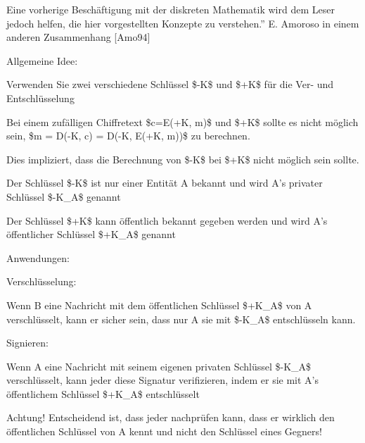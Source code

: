 \documentclass[a4paper]{article}
\begin{document}
\begin{multicols}{3}
      Eine vorherige Beschäftigung mit der diskreten Mathematik wird dem Leser
      jedoch helfen, die hier vorgestellten Konzepte zu verstehen.'' E.
      Amoroso in einem anderen Zusammenhang {[}Amo94{]}

      \begin{itemize*}
            \item Allgemeine Idee:
            \begin{itemize*}
                  \item Verwenden Sie zwei verschiedene Schlüssel \$-K\$ und \$+K\$ für die Ver- und Entschlüsselung
                  \item Bei einem zufälligen Chiffretext \$c=E(+K, m)\$ und \$+K\$ sollte es nicht möglich sein, \$m = D(-K, c) = D(-K, E(+K, m))\$ zu berechnen.
                  \begin{itemize*} \item Dies impliziert, dass die Berechnung von \$-K\$ bei \$+K\$ nicht möglich sein sollte. \end{itemize*}
                  \item Der Schlüssel \$-K\$ ist nur einer Entität A bekannt und wird A's privater Schlüssel \$-K\_A\$ genannt
                  \item Der Schlüssel \$+K\$ kann öffentlich bekannt gegeben werden und wird A's öffentlicher Schlüssel \$+K\_A\$ genannt
            \end{itemize*}
            \item Anwendungen:
            \begin{itemize*}
                  \item Verschlüsselung:
                  \begin{itemize*} \item Wenn B eine Nachricht mit dem öffentlichen Schlüssel \$+K\_A\$ von A verschlüsselt, kann er sicher sein, dass nur A sie mit \$-K\_A\$ entschlüsseln kann. \end{itemize*}
                  \item Signieren:
                  \begin{itemize*} \item Wenn A eine Nachricht mit seinem eigenen privaten Schlüssel \$-K\_A\$ verschlüsselt, kann jeder diese Signatur verifizieren, indem er sie mit A's öffentlichem Schlüssel \$+K\_A\$ entschlüsselt \end{itemize*}
                  \item Achtung! Entscheidend ist, dass jeder nachprüfen kann, dass er wirklich den öffentlichen Schlüssel von A kennt und nicht den Schlüssel eines Gegners!

\end{itemize*}
\end{itemize*}
\end{multicols}
\end{document}
